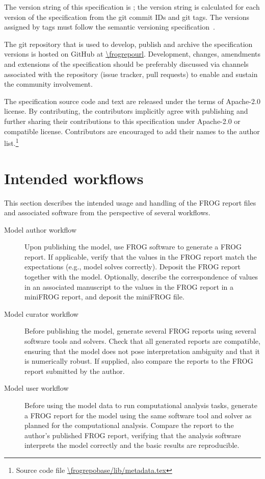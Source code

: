 The version string of this specification is \texttt{\frogspecversion}; the version string is calculated for each version of the specification from the git commit IDs and git tags. The versions assigned by tags must follow the semantic versioning specification~\cite{semver}.

The git repository that is used to develop, publish and archive the specification versions is hosted on GitHub at \url{\frogrepourl}. Development, changes, amendments and extensions of the specification should be preferably discussed via channels associated with the repository (issue tracker, pull requests) to enable and sustain the community involvement.

The specification source code and text are released under the terms of Apache-2.0 license. By contributing, the contributors implicitly agree with publishing and further sharing their contributions to this specification under Apache-2.0 or compatible license. Contributors are encouraged to add their names to the author list.\footnote{Source code file \url{\frogrepobase/lib/metadata.tex}}

\section{Intended workflows}

This section describes the intended usage and handling of the FROG report files and associated software from the perspective of several workflows.

\begin{description}
\item[Model author workflow] Upon publishing the model, use FROG software to generate a FROG report. If applicable, verify that the values in the FROG report match the expectations (e.g., model solves correctly). Deposit the FROG report together with the model. Optionally, describe the correspondence of values in an associated manuscript to the values in the FROG report in a miniFROG report, and deposit the miniFROG file.
\item[Model curator workflow] Before publishing the model, generate several FROG reports using several software tools and solvers. Check that all generated reports are compatible, ensuring that the model does not pose interpretation ambiguity and that it is numerically robust. If supplied, also compare the reports to the FROG report submitted by the author.
\item[Model user workflow] Before using the model data to run computational analysis tasks, generate a FROG report for the model using the same software tool and solver as planned for the computational analysis. Compare the report to the author's published FROG report, verifying that the analysis software interprets the model correctly and the basic results are reproducible.
\end{description}

